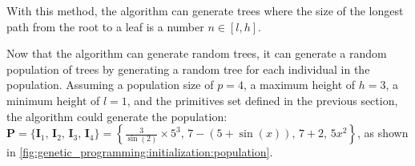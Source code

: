   With this method, the algorithm can generate trees where the size of the 
  longest path from the root to a leaf is a number \(n \in [l, h]\).

  Now that the algorithm can generate random trees, it can generate a random
  population of trees by generating a random tree for each individual in the
  population.
  Assuming a population size of \(p = 4\), a maximum height of \(h = 3\), a
  minimum height of \(l = 1\), and the primitives set defined in the previous
  section, the algorithm could generate the population: 
  \(
    \mathbf{P} = \{\mathbf{I}_1,\,\mathbf{I}_2,\,\mathbf{I}_3,\,\mathbf{I}_4\} 
      = \left\{
        \frac{3}{\sin(2)} \times 5^3,\,
        7 - (5 + \sin(x)),\,
        7 + 2,\,
        5x^2
      \right\}
  \), as shown in \vref{fig:genetic_programming:initialization:population}.

